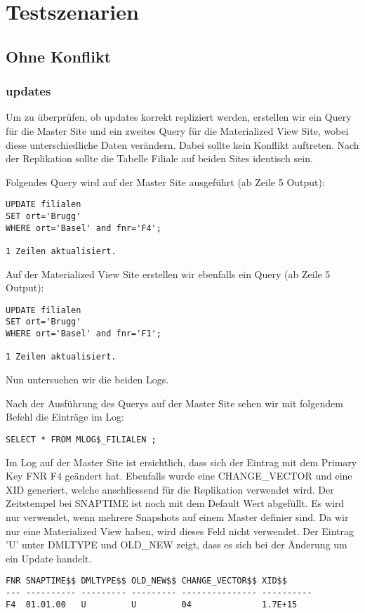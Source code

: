 \documentclass[11pt,a4paper,parskip=half]{scrartcl}
\begin{document}
\section{Testszenarien}
\subsection{Ohne Konflikt}
\subsubsection{updates}
Um zu überprüfen, ob updates korrekt repliziert werden, erstellen wir ein Query für die Master Site und ein zweites Query für die Materialized View Site, wobei diese unterschiedliche Daten verändern. Dabei sollte kein Konflikt auftreten. Nach der Replikation sollte die Tabelle Filiale auf beiden Sites identisch sein.

Folgendes Query wird auf der Master Site ausgeführt (ab Zeile 5 Output):
\begin{lstlisting}
UPDATE filialen
SET ort='Brugg'
WHERE ort='Basel' and fnr='F4'; 

1 Zeilen aktualisiert.
\end{lstlisting}

Auf der Materialized View Site erstellen wir ebenfalls ein Query (ab Zeile 5 Output):
\begin{lstlisting}
UPDATE filialen
SET ort='Brugg'
WHERE ort='Basel' and fnr='F1'; 

1 Zeilen aktualisiert.
\end{lstlisting}

Nun untersuchen wir die beiden Logs.

Nach der Ausführung des Querys auf der Master Site sehen wir mit folgendem Befehl die Einträge im Log:
\begin{lstlisting}
SELECT * FROM MLOG$_FILIALEN ;
\end{lstlisting}

Im Log auf der Master Site ist ersichtlich, dass sich der Eintrag mit dem Primary Key FNR F4 geändert hat. Ebenfalls wurde eine CHANGE\_VECTOR und eine XID generiert, welche anschliessend für die Replikation verwendet wird.  Der Zeitstempel bei SNAPTIME ist noch mit dem Default Wert abgefüllt. Es wird nur verwendet, wenn mehrere Snapshots auf einem Master definier sind. Da wir nur eine Materialized View haben, wird dieses Feld nicht verwendet. Der Eintrag 'U' unter DMLTYPE und  OLD\_NEW zeigt, dass es sich bei der Änderung um ein Update handelt.
\begin{lstlisting}
FNR SNAPTIME$$ DMLTYPE$$ OLD_NEW$$ CHANGE_VECTOR$$ XID$$
--- ---------- --------- --------- --------------- ----------
F4  01.01.00   U         U         04              1.7E+15 
\end{lstlisting}
\end{document}

